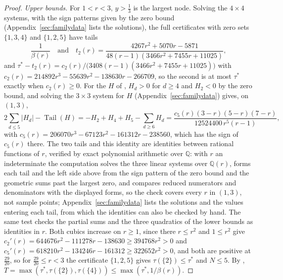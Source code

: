 \documentclass[11pt]{article}
\DeclareMathOperator{\Tail}{Tail}
\begin{document}
\begin{proof}
\emph{Upper bounds.}  For $1<r<3$, $y>\tfrac13$ is the largest node.
Solving the $4\times4$ systems, with the sign patterns given by the zero
bound (Appendix~\ref{sec:familydata} lists the solutions), the full
certificates with zero sets $\{1,3,4\}$ and $\{1,2,5\}$ have tails
\[
  \frac1{\beta(r)}\quad\text{and}\quad
  t_2(r)=\frac{4267r^2+5070r-5871}{48(r-1)(3466r^2+7455r+11025)},
\]
and $\tau^*-t_2(r)=c_2(r)/\bigl(3408(r-1)(3466r^2+7455r+11025)\bigr)$ with
$c_2(r)=214892r^3-55639r^2-138630r-266709$, so the second is at most
$\tau^*$ exactly when $c_2(r)\ge0$.  For the $H$ of
\cite[Theorem~5.3]{coefficient-mass-attainment}, $H_d>0$ for $d\ge4$ and $H_2<0$ by the zero
bound, and solving the $3\times3$ system for $H$
(Appendix~\ref{sec:familydata}) gives, on $(1,3)$,
\[
  2\sum_{d\le5}|H_d|-\Tail(H)=-H_2+H_4+H_5-\sum_{d\ge6}H_d
  =\frac{c_5(r)(3-r)(5-r)(7-r)}{12524400\,r^5(r-1)},
\]
with $c_5(r)=206070r^3-67123r^2-161312r-238560$, which has the sign of
$c_5(r)$ there.  The two tails and this identity are identities between
rational functions of $r$, verified by exact polynomial arithmetic over
$\mathbb Q$: with $r$ an indeterminate the computation
solves the three linear systems over $\mathbb Q(r)$, forms each tail and
the left side above from the sign pattern of the zero bound and the
geometric sums past the largest zero, and compares reduced numerators and
denominators with the displayed forms, so the check covers every $r$ in
$(1,3)$, not sample points; Appendix~\ref{sec:familydata} lists the
solutions and the values entering each tail, from which the identities can
also be checked by hand.  The same test checks the partial sums and the
three quadratics of the lower bounds as identities in $r$.  Both cubics
increase on $r\ge1$, since there $r\le r^2$ and $1\le r^2$ give
$c_2'(r)=644676r^2-111278r-138630\ge394768r^2>0$ and
$c_5'(r)=618210r^2-134246r-161312\ge322652r^2>0$, and both are positive
at $\tfrac{29}{20}$, so for $\tfrac{29}{20}\le r<3$ the certificate
$\{1,2,5\}$ gives $\tau(\{2\})\le\tau^*$ and $N\le5$.  By \cite[Theorem~5.3]{coefficient-mass-attainment},
$T=\max(\tau^*,\tau(\{2\}),\tau(\{4\}))\le\max(\tau^*,1/\beta(r))$.


\end{proof}
\end{document}

